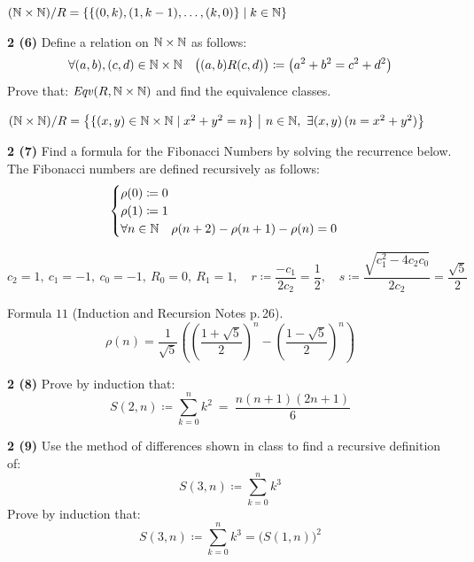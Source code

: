 \documentclass[11pt]{article}
\begin{document}
\vspace{6pt}
$(\mathbb{N}\times\mathbb{N})/R = \{\{(0,k),(1,k-1),\dots,(k,0)\} \mid k\in\mathbb{N}\}$

\newpage

\newpage
{}
\noindent\textbf{2 (6)} \quad Define a relation on $\mathbb{N}\times\mathbb{N}$ as follows:
$$\forall (a,b),(c,d)\in\mathbb{N}\times\mathbb{N} \quad \big((a,b)R(c,d)\big)\coloneqq\big(a^2+b^2=c^2+d^2\big)$$
Prove that: $\mathit{Eqv}(R,\mathbb{N}\times\mathbb{N})$ and find the equivalence classes.

\vspace{6pt}
$(\N\times\N)/R = \big\{\{(x,y)\in\N\times\N\mid x^2+y^2=n\}\ \big|\ n\in\N,\ \exists(x,y)\,(n=x^2+y^2)\big\}$

\newpage

\newpage
{}
\noindent\textbf{2 (7)} \quad Find a formula for the Fibonacci Numbers by solving the recurrence below. The Fibonacci numbers are defined recursively as follows:
$$\begin{cases}\rho(0)\coloneqq 0\\ \rho(1)\coloneqq 1\\ \forall n\in\mathbb{N} \quad \rho(n+2)-\rho(n+1)-\rho(n)=0\end{cases}$$

\vspace{6pt}
$c_2=1,\ c_1=-1,\ c_0=-1,\ R_0=0,\ R_1=1,\quad r\coloneqq\dfrac{-c_1}{2c_2}=\dfrac12,\quad s\coloneqq\dfrac{\sqrt{c_1^2-4c_2c_0}}{2c_2}=\dfrac{\sqrt5}{2}$

Formula $11$ (Induction and Recursion Notes p.\,26).
$$\rho(n) = \frac{1}{\sqrt5}\left(\left(\frac{1+\sqrt5}{2}\right)^{\!n} - \left(\frac{1-\sqrt5}{2}\right)^{\!n}\right)$$

\newpage

\newpage
{}
\noindent\textbf{2 (8)} \quad Prove by induction that:
$$S(2,n)\coloneqq\sum_{k=0}^n k^2 \ =\ \frac{n(n+1)(2n+1)}{6}$$

\vspace{6pt}
\newpage

\newpage
{}
\noindent\textbf{2 (9)} \quad Use the method of differences shown in class to find a recursive definition of:
$$S(3,n)\coloneqq\sum_{k=0}^n k^3$$
Prove by induction that:
$$S(3,n)\coloneqq\sum_{k=0}^n k^3 = \big(S(1,n)\big)^2$$
\end{document}
